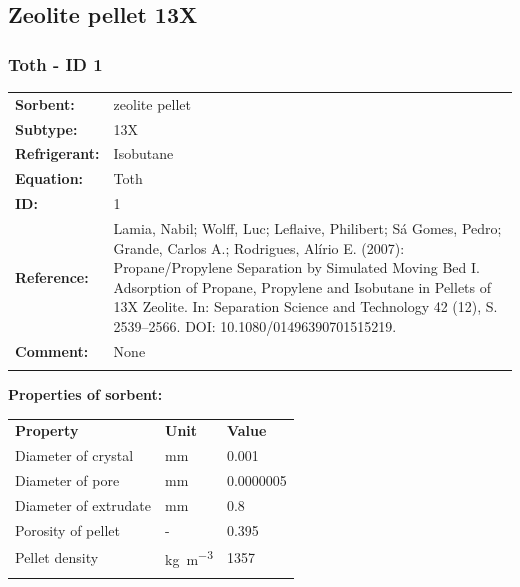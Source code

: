 \subsection{Zeolite pellet 13X}
%
\subsubsection{Toth - ID 1}
%
\begin{tabular}[l]{|lp{11.5cm}|}
\hline
\addlinespace

\textbf{Sorbent:} & zeolite pellet \\
\textbf{Subtype:} & 13X \\
\textbf{Refrigerant:} & Isobutane \\
\textbf{Equation:} & Toth \\
\textbf{ID:} & 1 \\
\textbf{Reference:} & Lamia, Nabil; Wolff, Luc; Leflaive, Philibert; Sá Gomes, Pedro; Grande, Carlos A.; Rodrigues, Alírio E. (2007): Propane/Propylene Separation by Simulated Moving Bed I. Adsorption of Propane, Propylene and Isobutane in Pellets of 13X Zeolite. In: Separation Science and Technology 42 (12), S. 2539–2566. DOI: 10.1080/01496390701515219. \\
\textbf{Comment:} & None \\

\addlinespace
\hline
\end{tabular}
\newline

\textbf{Properties of sorbent:}
\newline
%
\begin{longtable}[l]{lll}
\toprule
\addlinespace
\textbf{Property} & \textbf{Unit} & \textbf{Value} \\
\addlinespace
\midrule
\endhead
\bottomrule
\endfoot
\bottomrule
\endlastfoot
\addlinespace

Diameter of crystal & \si{\milli\meter} & 0.001\\
Diameter of pore & \si{\milli\meter} & 0.0000005\\
Diameter of extrudate & \si{\milli\meter} & 0.8\\
Porosity of pellet & - & 0.395\\
Pellet density & \si{\kilogram\per\cubic\meter} & 1357\\

\addlinespace\end{longtable}

